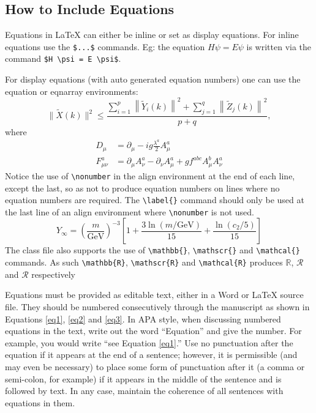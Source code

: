 \documentclass[10pt,a4paper]{article}
\begin{document}
\newpage
\begin{appendices}

\section{How to Include Equations}\label{sec4}

Equations in \LaTeX{} can either be inline or set as display equations. For
inline equations use the \verb+$...$+ commands. Eg: the equation
$H\psi = E \psi$ is written via the command \verb+$H \psi = E \psi$+.

For display equations (with auto generated equation numbers)
one can use the equation or eqnarray environments:
\begin{equation}
\|\tilde{X}(k)\|^2 \leq\frac{\sum\limits_{i=1}^{p}\left\|\tilde{Y}_i(k)\right\|^2+\sum\limits_{j=1}^{q}\left\|\tilde{Z}_j(k)\right\|^2 }{p+q},
\label{eq1}
\end{equation}
where
\begin{align}
D_\mu &=  \partial_\mu - ig \frac{\lambda^a}{2} A^a_\mu \nonumber \\
F^a_{\mu\nu} &= \partial_\mu A^a_\nu - \partial_\nu A^a_\mu + g f^{abc} A^b_\mu A^a_\nu
\label{eq2}
\end{align}
Notice the use of \verb+\nonumber+ in the align environment at the end
of each line, except the last, so as not to produce equation numbers on
lines where no equation numbers are required. The \verb+\label{}+ command
should only be used at the last line of an align environment where
\verb+\nonumber+ is not used.
\begin{equation}
Y_\infty = \left( \frac{m}{\textrm{GeV}} \right)^{-3}
    \left[ 1 + \frac{3 \ln(m/\textrm{GeV})}{15}
    + \frac{\ln(c_2/5)}{15} \right]
\label{eq3}
\end{equation}
The class file also supports the use of \verb+\mathbb{}+, \verb+\mathscr{}+ and
\verb+\mathcal{}+ commands. As such \verb+\mathbb{R}+, \verb+\mathscr{R}+
and \verb+\mathcal{R}+ produces $\mathbb{R}$, $\mathscr{R}$ and $\mathcal{R}$
respectively 

Equations must be provided as editable text, either in a Word or LaTeX source file. They should be numbered consecutively through the manuscript as shown in Equations \ref{eq1}, \ref{eq2} and \ref{eq3}. In APA style, when discussing numbered equations in the text, write out the word “Equation” and give the number. For example, you would write “see Equation \ref{eq1}.”
Use no punctuation after the equation if it appears at the end of a sentence; however, it is permissible (and may even be necessary) to place some form of punctuation after it (a comma or semi-colon, for example) if it appears in the middle of the sentence and is followed by text. In any case, maintain the coherence of all sentences with equations in them.



\end{appendices}
\end{document}
